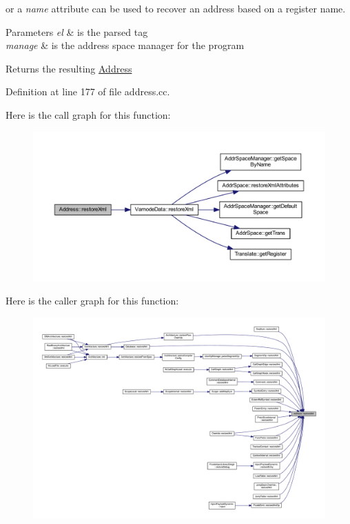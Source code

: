or a {\itshape name} attribute can be used to recover an address based on a register name. 
\begin{DoxyParams}{Parameters}
{\em el} & is the parsed tag \\
\hline
{\em manage} & is the address space manager for the program \\
\hline
\end{DoxyParams}
\begin{DoxyReturn}{Returns}
the resulting \mbox{\hyperlink{class_address}{Address}} 
\end{DoxyReturn}


Definition at line 177 of file address.\+cc.

Here is the call graph for this function\+:
\nopagebreak
\begin{figure}[H]
\begin{center}
\leavevmode
\includegraphics[width=350pt]{class_address_a31fdc8c33088abb3040027d35e7c4026_cgraph}
\end{center}
\end{figure}
Here is the caller graph for this function\+:
\nopagebreak
\begin{figure}[H]
\begin{center}
\leavevmode
\includegraphics[width=350pt]{class_address_a31fdc8c33088abb3040027d35e7c4026_icgraph}
\end{center}
\end{figure}
\mbox{\label{class_address_a18a4b4f313eca927ac348a943c886365}} 
